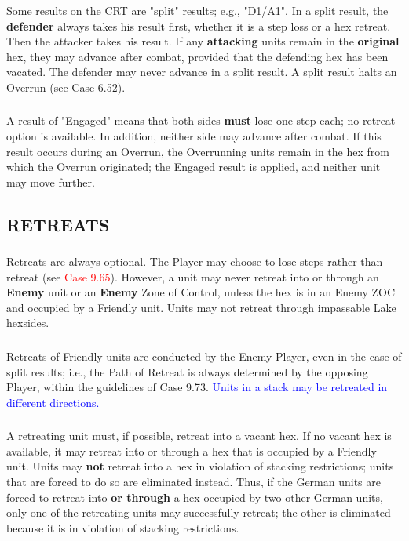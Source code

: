 \subsubsection{} Some results on the CRT are "split" results; e.g., "D1/A1". In a split result, the \textbf{defender} always takes his result first, whether it is a step loss or a hex retreat. Then the attacker takes his result. If any \textbf{attacking} units remain in the \textbf{original} hex, they may advance after combat, provided that the defending hex has been vacated. The defender may never advance in a split result. A split result halts an Overrun (see Case 6.52).

\subsubsection{} A result of "Engaged" means that both sides \textbf{must} lose one step each; no retreat option is available. In addition, neither side may advance after combat. If this result occurs during an Overrun, the Overrunning units remain in the hex from which the Overrun originated; the Engaged result is applied, and neither unit may move further.

\subsection{RETREATS}

\subsubsection{} Retreats are always optional. The Player may choose to lose steps rather than retreat (see \textcolor{red}{Case 9.65}). However, a unit may never retreat into or through an \textbf{Enemy} unit or an \textbf{Enemy} Zone of Control, unless the hex is in an Enemy ZOC and occupied by a Friendly unit. Units may not retreat through impassable Lake hexsides.

\subsubsection{} Retreats of Friendly units are conducted by the Enemy Player, even in the case of split results; i.e., the Path of Retreat is always determined by the opposing Player, within the guidelines of Case 9.73. \textcolor{blue}{Units in a stack may be retreated in different directions.}

\subsubsection{} A retreating unit must, if possible, retreat into a vacant hex. If no vacant hex is available, it may retreat into or through a hex that is occupied by a Friendly unit. Units may \textbf{not} retreat into a hex in violation of stacking restrictions; units that are forced to do so are eliminated instead. Thus, if the German units are forced to retreat into \textbf{or through} a hex occupied by two other German units, only one of the retreating units may successfully retreat; the other is eliminated because it is in violation of stacking restrictions.

